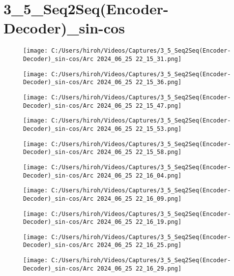 \documentclass{ltjsarticle}
\begin{document}
\section{3\_5\_Seq2Seq(Encoder-Decoder)\_sin-cos}
\begin{figure}[htbp]
  \centering
  \texttt{[image: C:/Users/hiroh/Videos/Captures/3\_5\_Seq2Seq(Encoder-Decoder)\_sin-cos/Arc 2024\_06\_25 22\_15\_31.png]}
\end{figure}
\begin{figure}[htbp]
  \centering
  \texttt{[image: C:/Users/hiroh/Videos/Captures/3\_5\_Seq2Seq(Encoder-Decoder)\_sin-cos/Arc 2024\_06\_25 22\_15\_36.png]}
\end{figure}
\begin{figure}[htbp]
  \centering
  \texttt{[image: C:/Users/hiroh/Videos/Captures/3\_5\_Seq2Seq(Encoder-Decoder)\_sin-cos/Arc 2024\_06\_25 22\_15\_47.png]}
\end{figure}
\begin{figure}[htbp]
  \centering
  \texttt{[image: C:/Users/hiroh/Videos/Captures/3\_5\_Seq2Seq(Encoder-Decoder)\_sin-cos/Arc 2024\_06\_25 22\_15\_53.png]}
\end{figure}
\begin{figure}[htbp]
  \centering
  \texttt{[image: C:/Users/hiroh/Videos/Captures/3\_5\_Seq2Seq(Encoder-Decoder)\_sin-cos/Arc 2024\_06\_25 22\_15\_58.png]}
\end{figure}
\begin{figure}[htbp]
  \centering
  \texttt{[image: C:/Users/hiroh/Videos/Captures/3\_5\_Seq2Seq(Encoder-Decoder)\_sin-cos/Arc 2024\_06\_25 22\_16\_04.png]}
\end{figure}
\begin{figure}[htbp]
  \centering
  \texttt{[image: C:/Users/hiroh/Videos/Captures/3\_5\_Seq2Seq(Encoder-Decoder)\_sin-cos/Arc 2024\_06\_25 22\_16\_09.png]}
\end{figure}
\begin{figure}[htbp]
  \centering
  \texttt{[image: C:/Users/hiroh/Videos/Captures/3\_5\_Seq2Seq(Encoder-Decoder)\_sin-cos/Arc 2024\_06\_25 22\_16\_19.png]}
\end{figure}
\begin{figure}[htbp]
  \centering
  \texttt{[image: C:/Users/hiroh/Videos/Captures/3\_5\_Seq2Seq(Encoder-Decoder)\_sin-cos/Arc 2024\_06\_25 22\_16\_25.png]}
\end{figure}
\begin{figure}[htbp]
  \centering
  \texttt{[image: C:/Users/hiroh/Videos/Captures/3\_5\_Seq2Seq(Encoder-Decoder)\_sin-cos/Arc 2024\_06\_25 22\_16\_29.png]}
\end{figure}
\end{document}
